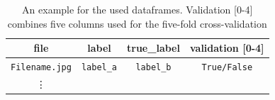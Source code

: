 \documentclass[a4paper,11pt]{scrartcl}
\theoremstyle{definition}
\begin{document}
\begin{table}[h]%
\centering %
\begin{tabular}{c c c c}
file&label&true\_label&validation [0-4]\\
\midrule %
\texttt{Filename.jpg} & \texttt{label\_a} & \texttt{label\_b} & \texttt{True/False}\\
\vdots&&&\\
\end{tabular}
\caption[Example Dataframe]{An example for the used dataframes. Validation [0-4] combines five columns used for the five-fold cross-validation} %
\label{tab:example_dataframe} %
\end{table}
\end{document}
